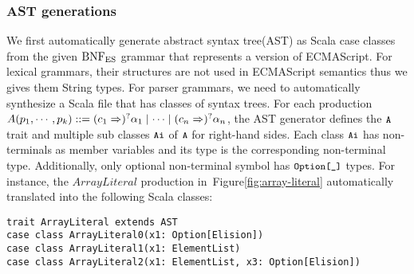 \subsubsection{AST generations}
We first automatically generate abstract syntax tree(AST) as Scala case classes
from the given \( \text{BNF}_{\text{ES}} \) grammar that represents a version of ECMAScript.
For lexical grammars, their structures are not used in ECMAScript semantics
thus we gives them String types. For parser grammars, we need to
automatically synthesize a Scala file that has classes of syntax trees.
For each production \(
  A(p_1, \cdots, p_k) ::=
  (c_1 \Rightarrow)^? \alpha_1 \mid
  \cdots \mid
  (c_n \Rightarrow)^? \alpha_n
\), the AST generator defines the \( \texttt{\small A} \) trait and
multiple sub classes \( \texttt{\small Ai} \) of \( \texttt{\small A} \) for right-hand sides.
Each class \( \texttt{\small Ai} \) has non-terminals as member variables and
its type is the corresponding non-terminal type. Additionally, only optional
non-terminal symbol has \( \texttt{\small Option[\_]} \) types.
For instance, the \( ArrayLiteral \) production
in~Figure\ref{fig:array-literal} automatically translated into the following
Scala classes:
\begin{lstlisting}[style=myScalastyle]
trait ArrayLiteral extends AST
case class ArrayLiteral0(x1: Option[Elision])
case class ArrayLiteral1(x1: ElementList)
case class ArrayLiteral2(x1: ElementList, x3: Option[Elision])
\end{lstlisting}

